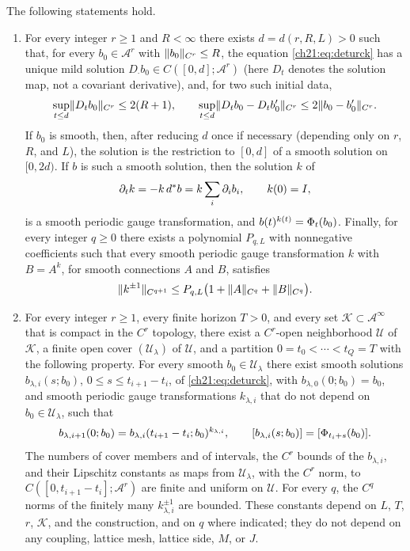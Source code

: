 \begin{theorem}\label{ch21:thm:continuum-atlas}
The following statements hold.
\begin{enumerate}
\item For every integer $r\ge1$ and $R<\infty$ there exists $d=d(r,R,L)>0$ such that, for every $b_0\in\mathcal A^r$ with $\lVert b_0\rVert_{C^r}\le R$, the equation \eqref{ch21:eq:deturck} has a unique mild solution $D_\cdot b_0\in C([0,d];\mathcal A^r)$ (here $D_t$ denotes the solution map, not a covariant derivative), and, for two such initial data,
\[
 \sup_{t\le d}\lVert D_tb_0\rVert_{C^r}\le2(R+1),\qquad
 \sup_{t\le d}\lVert D_tb_0-D_tb'_0\rVert_{C^r}\le2\lVert b_0-b'_0\rVert_{C^r}.
\]
If $b_0$ is smooth, then, after reducing $d$ once if necessary (depending only on $r$, $R$, and $L$), the solution is the restriction to $[0,d]$ of a smooth solution on $[0,2d)$. If $b$ is such a smooth solution, then the solution $k$ of
\[
 \partial_tk=-k\,d^*b=k\sum_i\partial_ib_i,\qquad k(0)=I,
\]
is a smooth periodic gauge transformation, and $b(t)^{k(t)}=\Phi_t(b_0)$. Finally, for every integer $q\ge0$ there exists a polynomial $P_{q,L}$ with nonnegative coefficients such that every smooth periodic gauge transformation $k$ with $B=A^k$, for smooth connections $A$ and $B$, satisfies
\[
 \lVert k^{\pm1}\rVert_{C^{q+1}}\le P_{q,L}\bigl(1+\lVert A\rVert_{C^q}+\lVert B\rVert_{C^q}\bigr).
\]
\item For every integer $r\ge1$, every finite horizon $T>0$, and every set $\mathscr K\subset\mathcal A^\infty$ that is compact in the $C^r$ topology, there exist a $C^r$-open neighborhood $\mathscr U$ of $\mathscr K$, a finite open cover $(\mathscr U_\lambda)$ of $\mathscr U$, and a partition $0=t_0<\cdots<t_Q=T$ with the following property. For every smooth $b_0\in\mathscr U_\lambda$ there exist smooth solutions $b_{\lambda,i}(s;b_0)$, $0\le s\le t_{i+1}-t_i$, of \eqref{ch21:eq:deturck}, with $b_{\lambda,0}(0;b_0)=b_0$, and smooth periodic gauge transformations $k_{\lambda,i}$ that do not depend on $b_0\in\mathscr U_\lambda$, such that
\[
 b_{\lambda,i+1}(0;b_0)=b_{\lambda,i}(t_{i+1}-t_i;b_0)^{k_{\lambda,i}},\qquad
 [b_{\lambda,i}(s;b_0)]=[\Phi_{t_i+s}(b_0)] .
\]
The numbers of cover members and of intervals, the $C^r$ bounds of the $b_{\lambda,i}$, and their Lipschitz constants as maps from $\mathscr U_\lambda$, with the $C^r$ norm, to $C([0,t_{i+1}-t_i];\mathcal A^r)$ are finite and uniform on $\mathscr U$. For every $q$, the $C^q$ norms of the finitely many $k_{\lambda,i}^{\pm1}$ are bounded. These constants depend on $L$, $T$, $r$, $\mathscr K$, and the construction, and on $q$ where indicated; they do not depend on any coupling, lattice mesh, lattice side, $M$, or $J$.

\end{enumerate}
\end{theorem}
